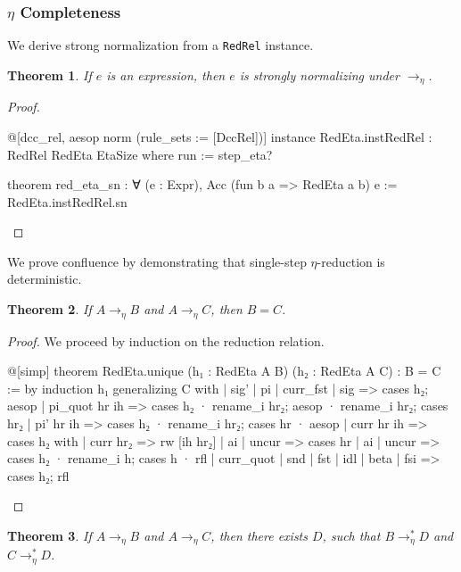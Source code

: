 \documentclass{article}
\newtheorem{theorem}{Theorem}
\newcommand{\etaarr}{\rightarrow_{\eta}}
\begin{document}
\subsubsection{\(\eta\) Completeness}

We derive strong normalization from a \texttt{RedRel} instance.

\begin{theorem}
  If \(e\) is an expression, then \(e\) is strongly normalizing under \(\rightarrow_{\eta}\).
\end{theorem}

\begin{proof}
\begin{leancode}

@[dcc_rel, aesop norm (rule_sets := [DccRel])]
instance RedEta.instRedRel : RedRel RedEta EtaSize where
  run := step_eta?

theorem red_eta_sn : ∀ (e : Expr), Acc (fun b a => RedEta a b) e := RedEta.instRedRel.sn
\end{leancode}
\end{proof}

We prove confluence by demonstrating that single-step \(\eta\)-reduction is deterministic.

\begin{theorem}
  If \(A \rightarrow_{\eta} B\) and \(A \rightarrow_{\eta} C\), then \(B = C\).
\end{theorem}

\begin{proof}\label{unique_eta}
  We proceed by induction on the reduction relation.
\begin{leancode}
@[simp] theorem RedEta.unique (h₁ : RedEta A B) (h₂ : RedEta A C) : B = C := by
  induction h₁ generalizing C with
  | sig' | pi | curr_fst | sig => cases h₂; aesop
  | pi_quot hr ih =>
    cases h₂
    · rename_i hr₂; aesop
    · rename_i hr₂; cases hr₂
  | pi' hr ih =>
    cases h₂
    · rename_i hr₂; cases hr
    · aesop
  | curr hr ih =>
    cases h₂ with
    | curr hr₂ => rw [ih hr₂]
    | ai | uncur => cases hr
  | ai | uncur =>
    cases h₂
    · rename_i h; cases h
    · rfl
  | curr_quot | snd | fst | idl | beta | fsi => cases h₂; rfl
\end{leancode}
\end{proof}

\begin{theorem}
  If \(A \etaarr B\) and \(A \etaarr C\), then there exists \(D\), such that \(B \etaarr^{*} D\) and \(C \etaarr^{*} D\).
\end{theorem}
\end{document}
